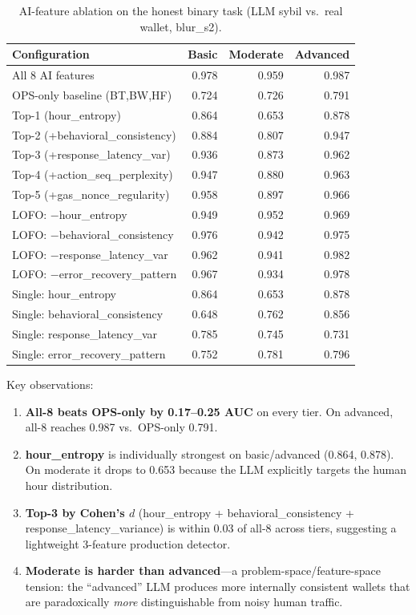 \documentclass[sigconf,nonacm=false]{acmart}
\begin{document}
\begin{table}[t]
\caption{AI-feature ablation on the honest binary task (LLM sybil vs.\ real wallet, blur\_s2).}
\label{tab:ablation}
\small
\begin{tabular}{lrrr}
\toprule
Configuration & Basic & Moderate & Advanced \\
\midrule
All 8 AI features        & 0.978 & 0.959 & 0.987 \\
OPS-only baseline (BT,BW,HF) & 0.724 & 0.726 & 0.791 \\
\midrule
Top-1 (hour\_entropy)              & 0.864 & 0.653 & 0.878 \\
Top-2 (+behavioral\_consistency)  & 0.884 & 0.807 & 0.947 \\
Top-3 (+response\_latency\_var)   & 0.936 & 0.873 & 0.962 \\
Top-4 (+action\_seq\_perplexity)  & 0.947 & 0.880 & 0.963 \\
Top-5 (+gas\_nonce\_regularity)   & 0.958 & 0.897 & 0.966 \\
\midrule
LOFO: $-$hour\_entropy              & 0.949 & 0.952 & 0.969 \\
LOFO: $-$behavioral\_consistency    & 0.976 & 0.942 & 0.975 \\
LOFO: $-$response\_latency\_var     & 0.962 & 0.941 & 0.982 \\
LOFO: $-$error\_recovery\_pattern   & 0.967 & 0.934 & 0.978 \\
\midrule
Single: hour\_entropy               & 0.864 & 0.653 & 0.878 \\
Single: behavioral\_consistency     & 0.648 & 0.762 & 0.856 \\
Single: response\_latency\_var      & 0.785 & 0.745 & 0.731 \\
Single: error\_recovery\_pattern    & 0.752 & 0.781 & 0.796 \\
\bottomrule
\end{tabular}
\end{table}

Key observations:
\begin{enumerate}
  \item \textbf{All-8 beats OPS-only by 0.17--0.25 AUC} on every tier. On advanced, all-8 reaches 0.987 vs.\ OPS-only 0.791.
  \item \textbf{hour\_entropy} is individually strongest on basic/advanced (0.864, 0.878). On moderate it drops to 0.653 because the LLM explicitly targets the human hour distribution.
  \item \textbf{Top-3 by Cohen's $d$} (hour\_entropy + behavioral\_consistency + response\_latency\_variance) is within 0.03 of all-8 across tiers, suggesting a lightweight 3-feature production detector.
  \item \textbf{Moderate is harder than advanced}---a problem-space/feature-space tension: the ``advanced'' LLM produces more internally consistent wallets that are paradoxically \textit{more} distinguishable from noisy human traffic.
\end{enumerate}
\end{document}
